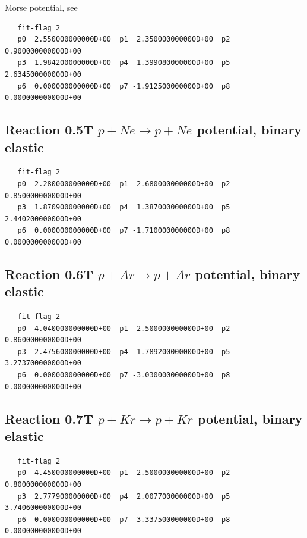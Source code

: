\documentclass[12pt,dvips]{article}
\begin{document}
Morse potential, see \cite{kn:Bachmann}
\begin{small}\begin{verbatim}
   fit-flag 2
   p0  2.550000000000D+00  p1  2.350000000000D+00  p2  0.900000000000D+00
   p3  1.984200000000D+00  p4  1.399080000000D+00  p5  2.634500000000D+00
   p6  0.000000000000D+00  p7 -1.912500000000D+00  p8  0.000000000000D+00
\end{verbatim}\end{small}


\newpage

\subsection{
Reaction 0.5T   $ p + Ne \rightarrow p + Ne $ potential, binary elastic
}

\begin{small}\begin{verbatim}
   fit-flag 2
   p0  2.280000000000D+00  p1  2.680000000000D+00  p2  0.850000000000D+00
   p3  1.870900000000D+00  p4  1.387000000000D+00  p5  2.440200000000D+00
   p6  0.000000000000D+00  p7 -1.710000000000D+00  p8  0.000000000000D+00
\end{verbatim}\end{small}


\newpage

\subsection{
Reaction 0.6T   $ p + Ar \rightarrow p + Ar $ potential, binary elastic }

\begin{small}\begin{verbatim}
   fit-flag 2
   p0  4.040000000000D+00  p1  2.500000000000D+00  p2  0.860000000000D+00
   p3  2.475600000000D+00  p4  1.789200000000D+00  p5  3.273700000000D+00
   p6  0.000000000000D+00  p7 -3.030000000000D+00  p8  0.000000000000D+00
\end{verbatim}\end{small}


\newpage

\subsection{
Reaction 0.7T   $ p + Kr \rightarrow p + Kr $ potential, binary elastic }

\begin{small}\begin{verbatim}
   fit-flag 2
   p0  4.450000000000D+00  p1  2.500000000000D+00  p2  0.800000000000D+00
   p3  2.777900000000D+00  p4  2.007700000000D+00  p5  3.740600000000D+00
   p6  0.000000000000D+00  p7 -3.337500000000D+00  p8  0.000000000000D+00
\end{verbatim}\end{small}
\end{document}
